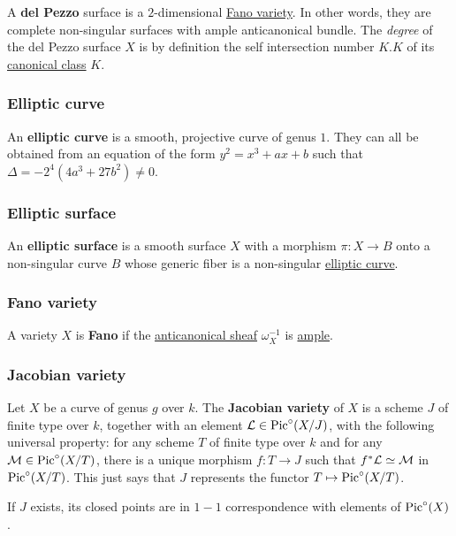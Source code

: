 \documentclass[11pt, english]{article}
\begin{document}
A \textbf{del Pezzo} surface is a $2$-dimensional \hyperref[fano]{Fano variety}. In other words, they are complete non-singular surfaces with ample anticanonical bundle. The \emph{degree} of the del Pezzo surface $X$ is by definition the self intersection number $K.K$ of its \hyperref[canonicaldivisor]{canonical class} $K$. 

\subsubsection{Elliptic curve}
\label{ellipticc}

An \textbf{elliptic curve} is a smooth, projective curve of genus $1$. They can all be obtained from an equation of the form $y^2=x^3+ax+b$ such that $\Delta = -2^4(4a^3+27b^2) \neq 0$. 

\subsubsection{Elliptic surface}
\label{elliptics}

An \textbf{elliptic surface} is a smooth surface $X$ with a morphism $\pi:X \to B$ onto a non-singular curve $B$ whose generic fiber is a non-singular \hyperref[ellipticc]{elliptic curve}.

\subsubsection{Fano variety}
\label{fano}

A variety $X$ is \textbf{Fano} if the \hyperref[anticanonical]{anticanonical  sheaf} $\omega_X^{-1}$ is \hyperref[amplelinebundle]{ample}.  

\subsubsection{Jacobian variety}
\label{jacobianvariety}

Let $X$ be a curve of genus $g$ over $k$. The \textbf{Jacobian variety} of $X$ is a scheme $J$ of finite type over $k$, together with an element $\mathcal{L} \in \operatorname{Pic}^\circ(X/J)$, with the following universal property: for any scheme $T$ of finite type over $k$ and for any $\mathcal M \in \operatorname{Pic}^\circ(X/T)$, there is a unique morphism $f:T \to J$ such that $f^\ast \mathcal{L} \simeq \mathcal M$ in $\operatorname{Pic}^\circ (X/T)$. This just says that $J$ represents the functor $T \mapsto \operatorname{Pic}^\circ(X/T)$. 

If $J$ exists, its closed points are in $1-1$ correspondence with elements of $\operatorname{Pic}^\circ (X)$.
\end{document}
